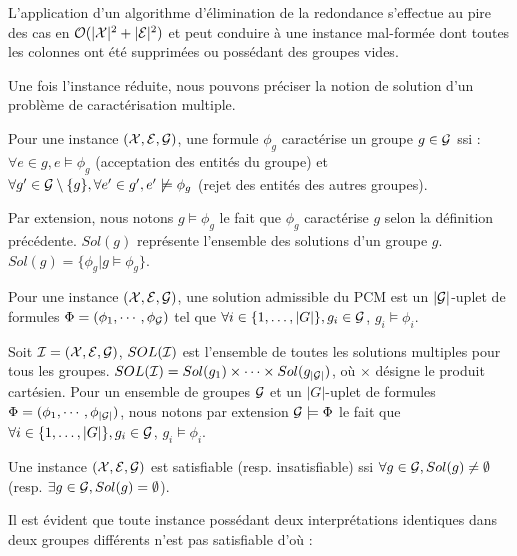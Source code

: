 L'application d'un algorithme d'élimination de la redondance s'effectue au pire des cas en ${\mathcal O}({|\cal X}|^2+|{\cal E}|^2)$ et peut conduire à une instance mal-formée dont toutes les colonnes ont été supprimées ou possédant des groupes vides.

Une fois l'instance réduite, nous pouvons préciser la notion de solution d'un problème de caractérisation multiple.

\begin{definition}
Pour une instance $({\cal X}, {\cal E}, {\cal G})$, une formule $\phi_g$
caractérise un groupe $g\in {\cal G}$ ssi :
$\forall e \in g, e \models \phi_g$ (acceptation des entités du groupe) et
$\forall g' \in {\cal G} \setminus \{g\},\forall e' \in g',  e' \not \models
\phi_g$ (rejet des entités des autres groupes).
\end{definition}

Par extension, nous notons $g \models \phi_g$ le fait que $\phi_g$ caractérise $g$ selon la définition précédente. $Sol(g)$ représente l'ensemble des solutions d'un groupe $g$. $Sol(g)=\{\phi_g|g \models \phi_g\}$.

\begin{definition}
Pour une instance $({\cal X}, {\cal E}, {\cal G})$, une solution
admissible du PCM  est un $|{\cal G}|$-uplet de formules
$\Phi=(\phi_1,\cdots,\phi_{{\cal G}})$ tel que  $\forall i\in \{1,\ldots,|G|\}, g_i \in
{\cal G}$, $g_i \models \phi_i$.
\end{definition}

Soit ${\cal I} = ({\cal X}, {\cal E}, {\cal G})$, $ SOL({\cal I})$ est
l'ensemble de toutes les solutions multiples pour tous les groupes. $SOL({\cal
I})=Sol(g_1) \times \cdots \times Sol(g_{|{\cal G}|})$, où $\times$ désigne le produit cartésien. Pour un ensemble de
groupes ${\cal G}$ et un $|G|$-uplet de formules $\Phi=(\phi_1,\cdots,\phi_{|{\cal G}|})$, nous notons par extension ${\cal G} \models \Phi$ le fait que
$\forall i\in \{1,\ldots,|G|\}, g_i \in {\cal G}$, $g_i \models \phi_i$.

\begin{definition}
Une instance $({\cal X}, {\cal E}, {\cal G})$ est satisfiable (resp. insatisfiable) ssi
$\forall g \in {\cal G}, Sol(g) \neq \emptyset$ (resp. $\exists g \in {\cal G},
Sol(g) = \emptyset$).
\end{definition}

Il est évident que toute instance possédant deux interprétations identiques dans deux groupes différents n'est pas satisfiable d'où :

